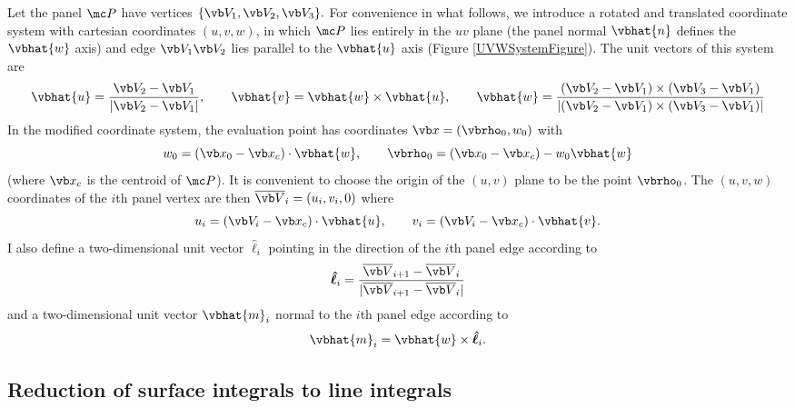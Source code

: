 \documentclass[letterpaper]{article}
\newcommand{\vbhatt}[1]{\boldsymbol{\hat #1}}
\begin{document}
Let the panel $\mc P$ have vertices
$\{\vb V_1, \vb V_2, \vb V_3\}.$
For convenience in what follows, we introduce a
rotated and translated coordinate system with 
cartesian coordinates
$(u,v,w)$, in which $\mc P$ lies entirely in the $uv$
plane (the panel normal $\vbhat{n}$ defines the $\vbhat{w}$ axis)
and edge $\vb V_1 \vb V_2$ lies parallel to the 
$\vbhat{u}$ axis (Figure \ref{UVWSystemFigure}).
The unit vectors of this system 
are 
$$ \vbhat{u}=\frac{\vb V_2 - \vb V_1}{|\vb V_2 - \vb V_1|},
   \qquad
   \vbhat{v}=\vbhat{w} \times \vbhat{u},
   \qquad
   \vbhat{w}=
    \frac{ (\vb V_2 - \vb V_1)\times(\vb V_3 - \vb V_1)}
         {|(\vb V_2 - \vb V_1)\times(\vb V_3 - \vb V_1)|}
$$
In the modified coordinate system, the evaluation point has
coordinates $\vb x = (\vbrho_0, w_0)$ with
$$ w_0 = (\vb x_0 - \vb x_c) \cdot \vbhat{w}, 
   \qquad
   \vbrho_0 = (\vb x_0 - \vb x_c) - w_0\vbhat{w}
$$
(where $\vb x_c$ is the centroid of $\mc P$).
It is convenient to choose the origin of the $(u,v)$ plane to be 
the point $\vbrho_0$. The $(u,v,w)$ coordinates of the $i$th 
panel vertex are then 
$\overline{\vb V}_i = (u_i, v_i, 0)$ where
$$ u_i=(\vb V_i-\vb x_c) \cdot \vbhat{u}, \qquad 
   v_i=(\vb V_i-\vb x_c) \cdot \vbhat{v}.
$$
I also define a two-dimensional 
unit vector $\vbhatt{\ell}_i$ pointing in the direction
of the $i$th panel edge according to
$$ \vbhatt{\ell}_i= \frac{  \overline{\vb V}_{i+1}-\overline{\vb V}_{i} }
                         { |\overline{\vb V}_{i+1}-\overline{\vb V}_{i}| }
$$
and a two-dimensional unit vector $\vbhat{m}_i$ normal to the $i$th 
panel edge according to 
$$ \vbhat{m}_i=\vbhat{w} \times \vbhatt{\ell}_i.$$

\subsection{Reduction of surface integrals to line integrals}
\end{document}
